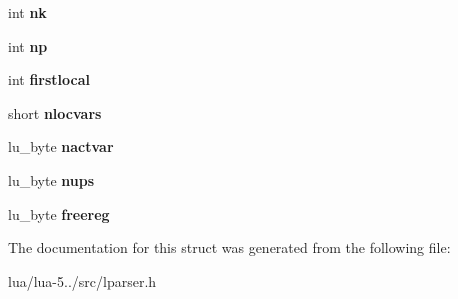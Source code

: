 \begin{DoxyCompactItemize}
\item 
\hypertarget{struct_func_state_a51f2362dabbe7e117feb2f059253a01b}{int {\bfseries nk}}\label{struct_func_state_a51f2362dabbe7e117feb2f059253a01b}

\item 
\hypertarget{struct_func_state_aa6952cddc83bd271703e1458d012d67d}{int {\bfseries np}}\label{struct_func_state_aa6952cddc83bd271703e1458d012d67d}

\item 
\hypertarget{struct_func_state_a7357e446fded54ea3d2f4cfe529a3648}{int {\bfseries firstlocal}}\label{struct_func_state_a7357e446fded54ea3d2f4cfe529a3648}

\item 
\hypertarget{struct_func_state_a5bc4b89742470aa42900e4a459db31df}{short {\bfseries nlocvars}}\label{struct_func_state_a5bc4b89742470aa42900e4a459db31df}

\item 
\hypertarget{struct_func_state_a0e00cba6eaa6fc648b7762976e9b748b}{lu\+\_\+byte {\bfseries nactvar}}\label{struct_func_state_a0e00cba6eaa6fc648b7762976e9b748b}

\item 
\hypertarget{struct_func_state_aa6595513c43642ce3b506131d847dd7b}{lu\+\_\+byte {\bfseries nups}}\label{struct_func_state_aa6595513c43642ce3b506131d847dd7b}

\item 
\hypertarget{struct_func_state_a99e672543fbe771557b576b69f54e551}{lu\+\_\+byte {\bfseries freereg}}\label{struct_func_state_a99e672543fbe771557b576b69f54e551}

\end{DoxyCompactItemize}


The documentation for this struct was generated from the following file\+:\begin{DoxyCompactItemize}
\item 
lua/lua-\/5../src/lparser.\+h\end{DoxyCompactItemize}
